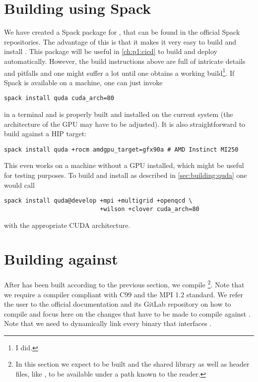 \section{Building \quda using Spack}
\label{sec:building:quda:spack}

We have created a Spack\cite{Gamblin_The_Spack_Package_2015} package for \quda, that can be found in the official Spack repositories\cite{spack:quda}. The advantage of this is that it makes it very easy to build and install \quda. This package will be useful in \cref{ch:p1:cicd} to build and deploy automatically. However, the build instructions above are full of intricate details and pitfalls and one might suffer a lot until one obtains a working build\footnote{I did.}. If Spack is available on a machine, one can just invoke
\begin{verbatim}
spack install quda cuda_arch=80
\end{verbatim}
in a terminal and \quda is properly built and installed on the current system (the architecture  of the GPU may have to be adjusted). It is also straightforward to build against a HIP target:
\begin{verbatim}
spack install quda +rocm amdgpu_target=gfx90a # AMD Instinct MI250
\end{verbatim}
This even works on a machine without a GPU installed, which might be useful for testing purposes. To build and install \quda as described in \cref{sec:building:quda} one would call
\begin{verbatim}
spack install quda@develop +mpi +multigrid +openqcd \
                           +wilson +clover cuda_arch=80
\end{verbatim}
with the appropriate CUDA architecture.


\section{Building \openqxd against \quda}
\label{sec:building:openqxd}

After \quda has been built according to the previous section, we compile \openqxd\footnote{In this section we expect \quda to be built and the shared library  as well as header files, like , to be available under a path known to the reader.}.
Note that we require a compiler compliant with C99 and the MPI 1.2 standard.
We refer the user to the official \openqxd documentation \cite{openqxd} and its GitLab repository \cite{gitlab:openqxd} on how to compile and focus here on the changes that have to be made to compile against \quda.
Note that we need to dynamically link every \openqxd binary that interfaces \quda.

